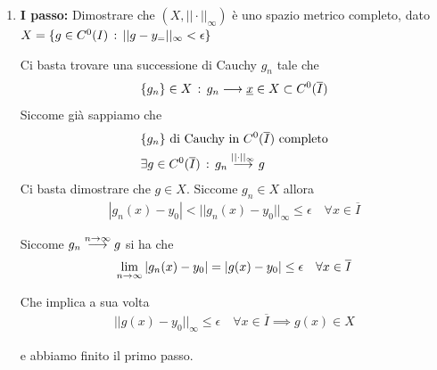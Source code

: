 \begin{enumerate}
	\item \textbf{I passo:} Dimostrare che $(X,||\cdot||_\infty)$ è uno spazio metrico completo, dato $X= \{g\in C^0(I) \, : \, ||g-y_=||_\infty <\epsilon\}$
	
	Ci basta trovare una successione di Cauchy $g_n$ tale che 
	\begin{align}
		\{g_n\} \in X \, : \, g_n \longrightarrow \underline{x} \in X \subset C^0(\overline{I})
	\end{align}
	Siccome già sappiamo che 
	\begin{align}
		{}&\{g_n\} \text{ di Cauchy in } C^0(\overline{I}) \text{ completo}\\	
		&\exists g \in C^0(\overline{I}) \, : \, g_n
		\overset{||\cdot||_\infty}{\longrightarrow} g
	\end{align}
	Ci basta dimostrare che $g\in X$. Siccome $g_n \in  X$ allora
	\begin{align}
		| g_n(x) - y_0| < || g_n(x) - y_0||_\infty \leq \epsilon \quad \forall x \in \overline{I}
	\end{align}
	
	Siccome $g_n \overset{n \rightarrow \infty}{\longrightarrow} g$ si ha che 
	\begin{align}
		\underset{n \rightarrow \infty}{\lim} \,| g_n(x) - y_0| = | g(x) - y_0|\leq \epsilon \quad \forall x \in \overline{I}
	\end{align}
	
	Che implica a sua volta
	\begin{align}
		|| g(x) - y_0||_\infty\leq \epsilon \quad \forall x \in \overline{I} \implies g(x)\in X
	\end{align}
	
	e abbiamo finito il primo passo.
	
	\newpage
	

\end{enumerate}
